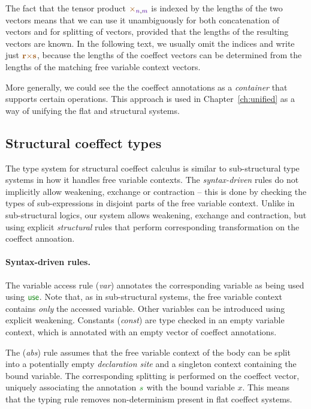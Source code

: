 \noindent
The fact that the tensor product $\atimes_{\sclrd{n},\sclrd{m}}$ is indexed by the lengths
of the two vectors means that we can use it unambiguously for both concatenation of vectors
and for splitting of vectors, provided that the lengths of the resulting vectors are known.
In the following text, we usually omit the indices and write just 
$\aclrd{\textbf{r}} \atimes \aclrd{\textbf{s}}$, because the lengths of the coeffect vectors 
can be determined from the lengths of the matching free variable context vectors.

More generally, we could see the the coeffect annotations as a \emph{container} 
\cite{types-containers} that supports certain operations. This approach is used in 
Chapter~\ref{ch:unified} as a way of unifying the flat and structural systems. 


\subsection{Structural coeffect types}
\label{sec:struct-calculus-types}

The type system for structural coeffect calculus is similar to sub-structural type systems
in how it handles free variable contexts. The \emph{syntax-driven} rules do not implicitly allow
weakening, exchange or contraction -- this is done by checking the types of sub-expressions
in disjoint parts of the free variable context. Unlike in sub-structural logics, our system
allows weakening, exchange and contraction, but using explicit \emph{structural} rules that
perform corresponding transformation on the coeffect annoation.

\paragraph{Syntax-driven rules.}
The variable access rule (\emph{var}) annotates the corresponding variable as being used
using $\cunit$. Note that, as in sub-structural systems, the free variable context contains 
\emph{only} the accessed variable. Other variables can be introduced using explicit weakening.
Constants (\emph{const}) are type checked in an empty variable context, which is annotated with
an empty vector of coeffect annotations.

The (\emph{abs}) rule assumes that the free variable context of the body can be split into
a potentially empty \emph{declaration site} and a singleton context containing the bound
variable. The corresponding splitting is performed on the coeffect vector, uniquely associating
the annotation $\cclrd{s}$ with the bound variable $x$. This means that the typing rule removes
non-determinism present in flat coeffect systems.

